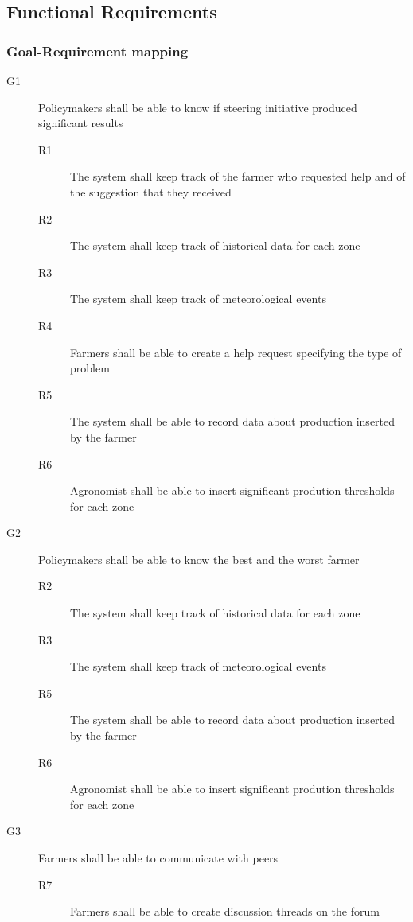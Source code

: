 \bigskip
\subsection{Functional Requirements}
\subsubsection{Goal-Requirement mapping}
\begin{description}
    \item [G1] Policymakers shall be able to know if steering initiative produced significant results
        \begin{description}
            \item[R1] The system shall keep track of the farmer who requested help and of the suggestion that they received
            \item[R2] The system shall keep track of historical data for each zone
            \item[R3] The system shall keep track of meteorological events
            \item[R4] Farmers shall be able to create a help request specifying  the type of problem
            \item[R5] The system shall be able to record data about production inserted by the farmer
            \item[R6] Agronomist shall be able to insert significant prodution thresholds for each zone   
        \end{description}
    \item [G2] Policymakers shall be able to know the best and the worst farmer
        \begin{description}
            \item[R2] The system shall keep track of historical data for each zone
            \item[R3] The system shall keep track of meteorological events
            \item[R5] The system shall be able to record data about production inserted by the farmer
            \item[R6] Agronomist shall be able to insert significant prodution thresholds for each zone   
        \end{description}
    \item [G3] Farmers shall be able to communicate with peers
        \begin{description}
            \item[R7] Farmers shall be able to create discussion threads on the forum

\end{description}
\end{description}

